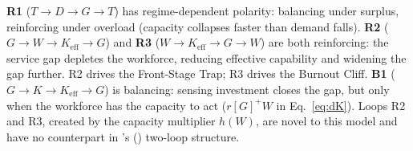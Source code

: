 \documentclass[msom,dblanonrev]{informs4}
\newcommand{\Gp}{[G]^{+}}
\newcommand{\Keff}{K_{\mathrm{eff}}}
\begin{document}
\textbf{R1} ($T \!\to\! D \!\to\! G \!\to\! T$) has regime-dependent polarity: balancing under surplus, reinforcing under overload (capacity collapses faster than demand falls). \textbf{R2} ($G \!\to\! W \!\to\! \Keff \!\to\! G$) and \textbf{R3} ($W \!\to\! \Keff \!\to\! G \!\to\! W$) are both reinforcing: the service gap depletes the workforce, reducing effective capability and widening the gap further. R2 drives the Front-Stage Trap; R3 drives the Burnout Cliff. \textbf{B1} ($G \!\to\! K \!\to\! \Keff \!\to\! G$) is balancing: sensing investment closes the gap, but only when the workforce has the capacity to act ($r\Gp W$ in Eq.~\ref{eq:dK}). Loops R2 and R3, created by the capacity multiplier $h(W)$, are novel to this model and have no counterpart in \citeauthor{oliva2001cutting}'s (\citeyear{oliva2001cutting}) two-loop structure.
\end{document}

